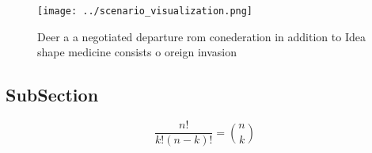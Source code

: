 \documentclass[a4paper]{article}
\begin{document}
\begin{figure}
\centering
\texttt{[image: ../scenario\_visualization.png]}
\caption{Deer a a negotiated departure rom conederation in addition to Idea shape medicine consists o oreign invasion 
}
\end{figure}
 
\subsection{SubSection}

\[ \frac{n!}{k!(n-k)!} = \binom{n}{k} \]
\end{document}
